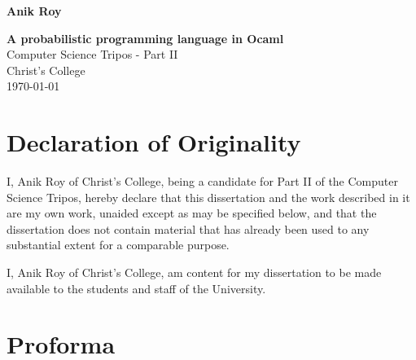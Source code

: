 \documentclass[12pt,notitlepage,twoside,a4paper]{report}
\begin{document}





\pagestyle{empty}

\hfill{\LARGE \bf Anik Roy}

\vspace*{60mm}
\begin{center}
\Huge
{\bf A probabilistic programming language in Ocaml} \\
\vspace*{5mm}
Computer Science Tripos - Part II \\
\vspace*{5mm}
Christ's College \\
\vspace*{5mm}
\today  %
\end{center}

\cleardoublepage


\setcounter{page}{1}
\pagestyle{plain}

\chapter*{Declaration of Originality}

I, Anik Roy of Christ's College, being a candidate for Part II of the Computer Science Tripos, hereby declare that this dissertation and the work described in it are my own work, unaided except as may be specified below, and that the dissertation does not contain material that has already been used to any substantial extent for a comparable purpose.

I, Anik Roy of Christ's College, am content for my dissertation to be made available to the students and staff of the University. 

\bigskip
{}

\medskip
{}
\clearpage

\chapter*{Proforma}
\immediate{}
\immediate{}
\end{document}
